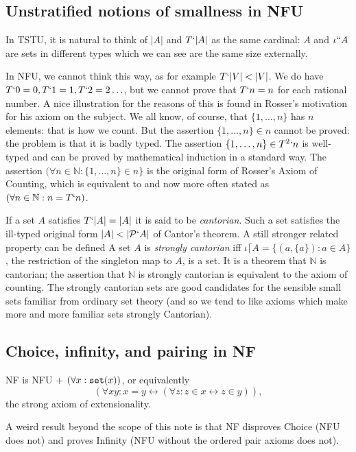 \documentclass[12pt]{article}
\begin{document}
\subsection{Unstratified notions of smallness in NFU}

In TSTU, it is natural to think of $|A|$ and $T`|A|$ as the same cardinal:  $A$ and $\iota``A$ are sets in different types which we can see are the same size externally.

In NFU, we cannot think this way, as for example $T`|V| < |V|$.  We do have $T`0 = 0,  T`1=1, T`2 = 2\ldots$, but we cannot prove that $T`n = n$ for each rational number.
A nice illustration for the reasons of this is found in Rosser's motivation for his axiom on the subject.  We all know, of course, that $\{1,\ldots,n\}$ has $n$ elements:  that is how we count.
But the assertion $\{1,\ldots,n\} \in n$ cannot be proved:  the problem is that it is badly typed.  The assertion $\{1,\ldots,n\}\in T^2`n$ is well-typed and can be proved by mathematical induction in a standard way.
The assertion $(\forall n \in {\mathbb N}:\{1,\ldots,n\} \in n\}$ is the original form of Rosser's Axiom of Counting, which is equivalent to and now more often stated as $(\forall n \in {\mathbb N}:n=T`n)$.

If a set $A$ satisfies $T`|A| = |A|$ it is said to be {\em cantorian\/}.  Such a set satisfies the ill-typed original form $|A|<|{\cal P}`A|$ of Cantor's theorem.  A still stronger related property can be defined
A set $A$ is {\em strongly cantorian\/} iff $\iota\lceil A = \{(a,\{a\}):a \in A\}$, the restriction of the singleton map to $A$, is a set.  It is a theorem that $\mathbb N$ is cantorian;  the assertion that $\mathbb N$ is strongly cantorian is equivalent to the axiom of counting.  The strongly cantorian sets are good candidates for the sensible small sets familiar from ordinary set theory (and so we tend to like axioms which make more and more familiar sets strongly Cantorian).

\subsection{Choice, infinity, and pairing in NF}

NF is NFU + $(\forall x:{\tt set}(x))$, or equivalently $$(\forall xy:x=y \leftrightarrow (\forall z:z \in x \leftrightarrow z \in y)),$$ the strong axiom of extensionality.

A weird result beyond the scope of this note is that NF disproves Choice (NFU does not) and proves Infinity (NFU without the ordered pair axioms does not).
\end{document}
